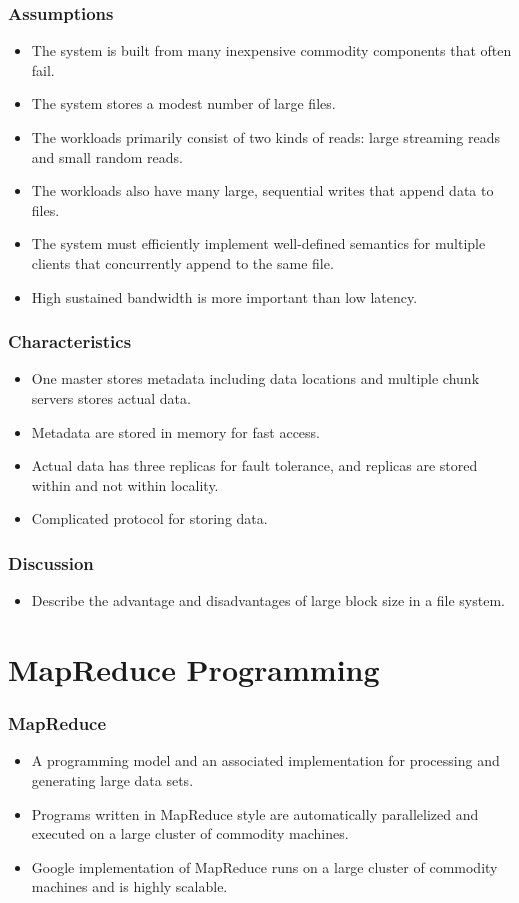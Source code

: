 \documentclass{beamer}
\begin{document}
\begin{frame}
  \frametitle{Assumptions}
  \begin{itemize}
    \item The system is built from many inexpensive commodity
      components that often fail.
    \item The system stores a modest number of large files.
    \item The workloads primarily consist of two kinds of reads: large
      streaming reads and small random reads.
    \item The workloads also have many large, sequential writes that
      append data to files.
    \item The system must efficiently implement well-defined semantics
      for multiple clients that concurrently append to the same file.
    \item High sustained bandwidth is more important than low latency.
  \end{itemize}
\end{frame}

\begin{frame}
  \frametitle{Characteristics}
  \begin{itemize}
    \item One master stores metadata including data locations and
      multiple chunk servers stores actual data.
    \item Metadata are stored in memory for fast access.
    \item Actual data has three replicas for fault tolerance, and
      replicas are stored within and not within locality.
    \item Complicated protocol for storing data.
  \end{itemize}
\end{frame}

\begin{frame}
  \frametitle{Discussion}
  \begin{itemize}
    \item Describe the advantage and disadvantages of large block size
      in a file system.
  \end{itemize}
\end{frame}

\section{MapReduce Programming}

\begin{frame}
  \frametitle{MapReduce}
  \begin{itemize}
  \item A programming model and an associated implementation for
    processing and generating large data sets.
  \item Programs written in MapReduce style are automatically
    parallelized and executed on a large cluster of commodity
    machines.
  \item Google implementation of MapReduce runs on a large cluster of
    commodity machines and is highly scalable.
  \end{itemize}
\end{frame}
\end{document}
